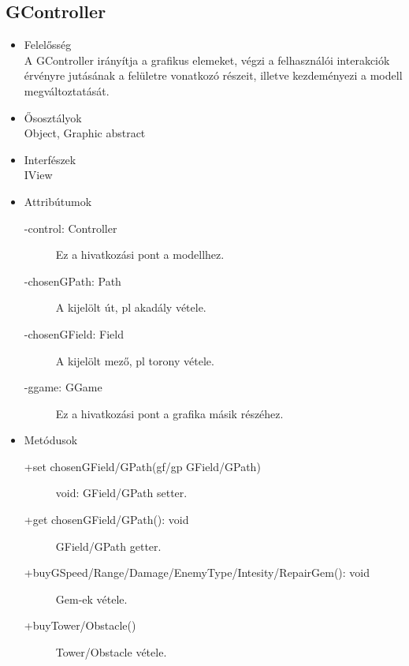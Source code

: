 \subsection{GController}
\begin{itemize}
\item Felelősség\\
A GController irányítja a grafikus elemeket, végzi a felhasználói interakciók érvényre jutásának a felületre vonatkozó részeit, illetve kezdeményezi a modell megváltoztatását.
\item Ősosztályok\\
Object, Graphic abstract
\item Interfészek\\
IView
\item Attribútumok
	\begin{description}
		\item[-control: Controller] Ez a hivatkozási pont a modellhez.
		\item[-chosenGPath: Path] A kijelölt út, pl akadály vétele.
		\item[-chosenGField: Field] A kijelölt mező, pl torony vétele.
		\item[-ggame: GGame] Ez a hivatkozási pont a grafika másik részéhez.
\end{description}
\item Metódusok
	\begin{description}
		\item[+set chosenGField/GPath(gf/gp GField/GPath)] void: GField/GPath setter.
		\item[+get chosenGField/GPath(): void] GField/GPath getter.
		\item[+buyGSpeed/Range/Damage/EnemyType/Intesity/RepairGem(): void] Gem-ek vétele.
		\item[+buyTower/Obstacle()] Tower/Obstacle vétele.
	\end{description}
\end{itemize}

